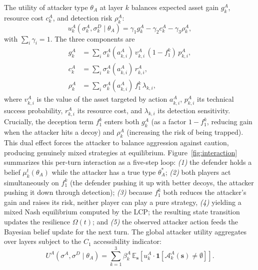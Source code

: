 \documentclass[conference]{IEEEtran}
\newcommand{\E}{\mathbb{E}}
\newcommand{\indic}{\mathbf{1}}
\begin{document}
The utility of attacker type $\theta_A$ at layer $k$ balances expected asset
gain $g_k^A$, resource cost $c_k^A$, and detection risk $\rho_k^A$:
\begin{equation}
u_k^A(\sigma_k^A,\sigma_k^D\mid\theta_A) =
\gamma_1 g_k^A - \gamma_2 c_k^A - \gamma_3 \rho_k^A,
\label{eq:util_A}
\end{equation}
with $\sum_i\gamma_i=1$. The three components are
\begin{align}
g_k^A &= \sum_i \sigma_k^A(a_{k,i}^A)\,v_{k,i}^A\,(1-f_1^k)\,p_{k,i}^A,
\label{eq:gain}\\
c_k^A &= \sum_i \sigma_k^A(a_{k,i}^A)\,r_{k,i}^A,
\label{eq:acost}\\
\rho_k^A &= \sum_i \sigma_k^A(a_{k,i}^A)\,f_1^k\,\lambda_{k,i},
\label{eq:risk}
\end{align}
where $v_{k,i}^A$ is the value of the asset targeted by action $a_{k,i}^A$,
$p_{k,i}^A$ its technical success probability, $r_{k,i}^A$ its resource cost,
and $\lambda_{k,i}$ its detection sensitivity. Crucially, the deception term
$f_1^k$ enters both $g_k^A$ (as a factor $1-f_1^k$, reducing gain when the
attacker hits a decoy) and $\rho_k^A$ (increasing the risk of being trapped).
This dual effect forces
the attacker to balance aggression against caution, producing genuinely mixed
strategies at equilibrium. Figure~\ref{fig:interaction} summarizes this per-turn
interaction as a five-step loop: \emph{(1)} the defender holds a belief
$\mu_k^t(\theta_A)$ while the attacker has a true type $\theta_A^*$;
\emph{(2)} both players act simultaneously on $f_1^k$ (the defender pushing it
up with better decoys, the attacker pushing it down through detection);
\emph{(3)} because $f_1^k$ both reduces the attacker's gain and raises its risk,
neither player can play a pure strategy, \emph{(4)} yielding a mixed Nash
equilibrium computed by the LCP; the resulting state transition updates the
resilience $\Omega(t)$; and \emph{(5)} the observed attacker action feeds the
Bayesian belief update for the next turn. The global attacker utility aggregates
over layers subject to the $C_1$ accessibility indicator:
\begin{equation}
U^A(\sigma^A,\sigma^D\mid\theta_A) = \sum_{k=1}^3 \beta_k^A\,
\E_{\mathbf{s}}\!\left[u_k^A\cdot\indic[\mathcal{A}_k^A(\mathbf{s})\neq\emptyset]
\right].
\label{eq:util_A_global}
\end{equation}
\end{document}
